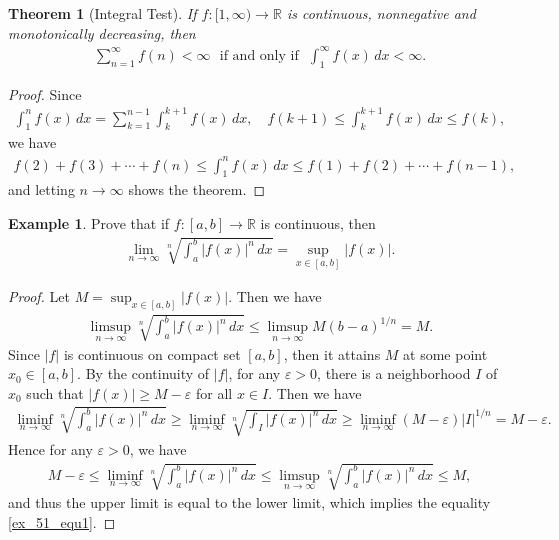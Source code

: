 \documentclass[11pt]{book}
\newtheorem{theorem}{Theorem}[chapter]
\theoremstyle{definition}
\newtheorem{example}{Example}[chapter]
\numberwithin{equation}{chapter}
\begin{document}
\begin{theorem}[Integral Test]
If $f: [1,\infty) \to \mathbb{R}$ is continuous, nonnegative and monotonically decreasing, then
\begin{align*}
    \sum^\infty_{n=1} f(n) < \infty \,\,\,\, \text{if and only if} \,\,\,\, \int^\infty_{1} f(x) \,dx < \infty.
\end{align*}
\end{theorem}
\begin{proof}
Since
\begin{align*}
    \int^n_1 f(x) \,dx = \sum^{n-1}_{k=1} \int^{k+1}_k f(x) \,dx, \quad f(k+1) \leq \int^{k+1}_k f(x) \,dx \leq f(k),
\end{align*}
we have 
\begin{align*}
    f(2) + f(3) + \cdots + f(n) \leq \int^n_1 f(x) \,dx \leq f(1) + f(2) + \cdots + f(n - 1),
\end{align*}
and letting $n \to \infty$ shows the theorem.
\end{proof}

\medskip

\begin{example}
Prove that if $f: [a,b] \to \mathbb{R}$ is continuous, then
\begin{align}\label{ex_51_equ1}
    \lim_{n\to\infty} \sqrt[n]{\int^b_a \left|f(x)\right|^n \,dx} = \sup_{x \in [a,b]} \left|f(x)\right|.
\end{align}
\end{example}
\begin{proof}
Let $M = \sup_{x \in [a,b]} \left|f(x)\right|$. Then we have
\begin{align*}
    \limsup_{n\to\infty} \sqrt[n]{\int^b_a \left|f(x)\right|^n \,dx} \leq \limsup_{n\to\infty} M(b-a)^{1/n}  = M.
\end{align*}
Since $\left|f\right|$ is continuous on compact set $[a,b]$, then it attains $M$ at some point $x_0 \in [a,b]$. By the continuity of $\left|f\right|$, for any $\varepsilon > 0$, there is a neighborhood $I$ of $x_0$ such that $\left|f(x)\right| \geq M - \varepsilon$ for all $x \in I$. Then we have
\begin{align*}
    \liminf_{n\to\infty} \sqrt[n]{\int^b_a \left|f(x)\right|^n \,dx} \geq \liminf_{n\to\infty} \sqrt[n]{\int_I \left|f(x)\right|^n \,dx} \geq \liminf_{n\to\infty} (M - \varepsilon) \left|I\right|^{1/n} = M - \varepsilon.
\end{align*}
Hence for any $\varepsilon > 0$, we have
\begin{align*}
    M - \varepsilon \leq \liminf_{n\to\infty} \sqrt[n]{\int^b_a \left|f(x)\right|^n \,dx} \leq \limsup_{n\to\infty} \sqrt[n]{\int^b_a \left|f(x)\right|^n \,dx} \leq M,
\end{align*}
and thus the upper limit is equal to the lower limit, which implies the equality \eqref{ex_51_equ1}.
\end{proof}
\end{document}
